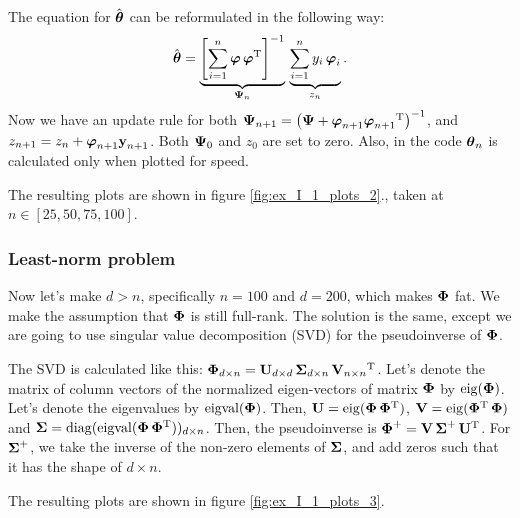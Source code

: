 The equation for $\hat{\v{\theta}}$ can be reformulated in the following way:
\begin{equation}
	\hat{\v{\theta}} = \underbrace{\left[\sum\limits_{i=1}^n{\v{\varphi}\,\v{\varphi}\T}\right]^{-1}}_{\v{\Psi}_n}\,
	\underbrace{\sum\limits_{i=1}^n{y_{i}\,\v{\varphi}_{i} }}_{z_n}.
\end{equation}
Now we have an update rule for both $\v{\Psi}_{n+1} = \brc{\v{\Psi} + \v{\varphi}_{n+1}\v{\varphi}_{n+1}\T}^{-1}$, and $z_{n+1} = z_n + \v{\varphi}_{n+1}\v{y}_{n+1}$.
Both $\v{\Psi}_0$ and $z_0$ are set to zero. 
Also, in the code $\v{\theta}_n$ is calculated only when plotted for speed.

The resulting plots are shown in figure \ref{fig:ex_I_1_plots_2}.,
taken at $n\in[25, 50, 75, 100]$.

\subsubsection*{Least-norm problem}

Now let's make $d>n$, specifically $n=100$ and $d=200$, which makes $\v{\Phi}$ fat.
We make the assumption that $\v{\Phi}$ is still full-rank.
The solution is the same, except we are going to use singular value decomposition (SVD)
for the pseudoinverse of $\v{\Phi}$.

The SVD is calculated like this: $\v{\Phi}_{d\times n}=\v{U}_{d\times d}\,\v{\Sigma}_{d\times n}\,\v{V}_{n\times n}\T$. Let's denote the matrix of column vectors of the normalized eigen-vectors 
of matrix $\v{\Phi}$ by $\eig(\v{\Phi})$. Let's denote the eigenvalues by $\operatorname{eigval}(\v{\Phi})$.
Then, $\v{U} = \eig(\v{\Phi}\,\v{\Phi}\T)$, $\v{V} = \eig(\v{\Phi}\T\,\v{\Phi})$ and
$\v{\Sigma} = \diag(\operatorname{eigval}(\v{\Phi}\,\v{\Phi}\T))_{d\times n}$.
Then, the pseudoinverse is $\v{\Phi}^+=\v{V}\,\v{\Sigma}^+\,\v{U}\T$.
For $\v{\Sigma}^+$, we take the inverse of the non-zero elements of $\v{\Sigma}$, and add
zeros such that it has the shape of $d\times n$.

The resulting plots are shown in figure \ref{fig:ex_I_1_plots_3}.

